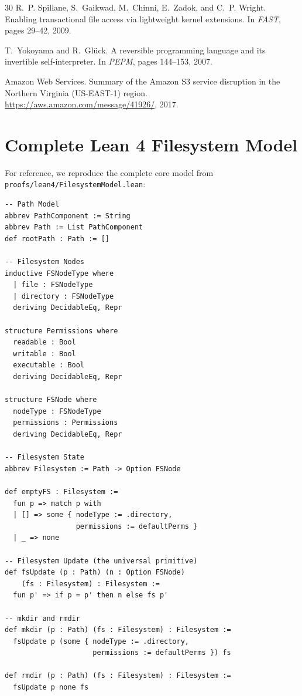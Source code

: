 \documentclass[11pt,a4paper]{article}
\begin{document}
\begin{thebibliography}{30}
R.~P. Spillane, S.~Gaikwad, M.~Chinni, E.~Zadok, and C.~P. Wright.
\newblock Enabling transactional file access via lightweight kernel extensions.
\newblock In \emph{FAST}, pages 29--42, 2009.

T.~Yokoyama and R.~Gl{\"u}ck.
\newblock A reversible programming language and its invertible self-interpreter.
\newblock In \emph{PEPM}, pages 144--153, 2007.

{Amazon Web Services}.
\newblock Summary of the {Amazon S3} service disruption in the {Northern
  Virginia} ({US-EAST-1}) region.
\newblock
  \url{https://aws.amazon.com/message/41926/}, 2017.

\end{thebibliography}

\appendix

\section{Complete Lean 4 Filesystem Model}
\label{app:model}

For reference, we reproduce the complete core model from
\texttt{proofs/lean4/FilesystemModel.lean}:

\begin{lstlisting}[style=leanstyle,caption={Core filesystem model (abbreviated).}]
-- Path Model
abbrev PathComponent := String
abbrev Path := List PathComponent
def rootPath : Path := []

-- Filesystem Nodes
inductive FSNodeType where
  | file : FSNodeType
  | directory : FSNodeType
  deriving DecidableEq, Repr

structure Permissions where
  readable : Bool
  writable : Bool
  executable : Bool
  deriving DecidableEq, Repr

structure FSNode where
  nodeType : FSNodeType
  permissions : Permissions
  deriving DecidableEq, Repr

-- Filesystem State
abbrev Filesystem := Path -> Option FSNode

def emptyFS : Filesystem :=
  fun p => match p with
  | [] => some { nodeType := .directory,
                 permissions := defaultPerms }
  | _ => none

-- Filesystem Update (the universal primitive)
def fsUpdate (p : Path) (n : Option FSNode)
    (fs : Filesystem) : Filesystem :=
  fun p' => if p = p' then n else fs p'

-- mkdir and rmdir
def mkdir (p : Path) (fs : Filesystem) : Filesystem :=
  fsUpdate p (some { nodeType := .directory,
                     permissions := defaultPerms }) fs

def rmdir (p : Path) (fs : Filesystem) : Filesystem :=
  fsUpdate p none fs
\end{lstlisting}
\end{document}
